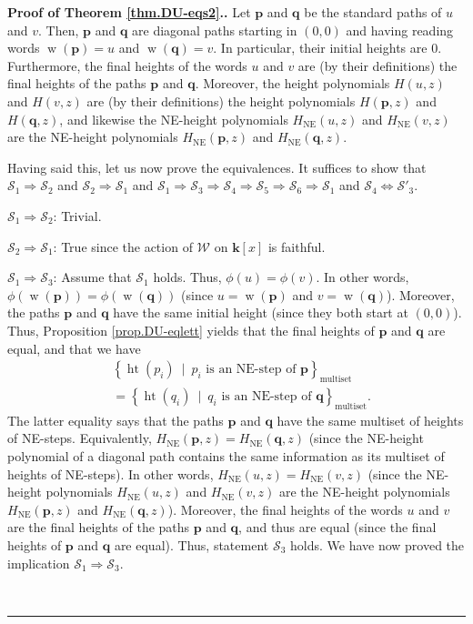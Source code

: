 \documentclass[numbers=enddot,12pt,final,onecolumn,notitlepage]{scrartcl}%
\theoremstyle{definition}
\newenvironment{proof}[1][Proof]{\noindent\textbf{#1.} }{\ \rule{0.5em}{0.5em}}
\newcommand{\W}{\mathcal{W}}
\newcommand{\kk}{\mathbf{k}}
\newcommand{\pp}{\mathbf{p}}
\newcommand{\qq}{\mathbf{q}}
\newcommand{\NE}{\operatorname{NE}}
\newcommand{\w}{\operatorname{w}}
\newcommand{\htt}{\operatorname{ht}}
\newcommand{\multiset}{\operatorname{multiset}}
\newcommand{\tup}[1]{\left( #1 \right)}
\begin{document}
\begin{proof}[Proof of Theorem \ref{thm.DU-eqs2}.]
Let $\pp$ and $\qq$ be the standard paths of $u$ and $v$.
Then, $\pp$ and $\qq$ are diagonal paths starting in $\tup{0,0}$ and having reading words $\w\tup{\pp} = u$ and $\w\tup{\qq} = v$.
In particular, their initial heights are $0$.
Furthermore,
the final heights of the words $u$ and $v$ are (by their definitions)
the final heights of the paths $\pp$ and $\qq$.
Moreover, the height polynomials $H\tup{u,z}$ and $H\tup{v,z}$ are (by
their definitions) the height polynomials $H\left(  \pp,z\right)  $ and
$H\left(  \qq,z\right)  $, and likewise the NE-height polynomials
$H_{\NE}\left(  u,z\right)  $ and $H_{\NE}\left(  v,z\right)  $ are
the NE-height polynomials $H_{\NE}\left(  \pp,z\right)  $ and $H_{\NE}\left(  \qq,z\right)  $.

Having said this, let us now prove the equivalences. It suffices to show that $\mathcal{S}_1 \Longrightarrow \mathcal{S}_2$ and $\mathcal{S}_2 \Longrightarrow \mathcal{S}_1$ and $\mathcal{S}_1 \Longrightarrow \mathcal{S}_3 \Longrightarrow \mathcal{S}_4 \Longrightarrow \mathcal{S}_5 \Longrightarrow \mathcal{S}_6 \Longrightarrow \mathcal{S}_1$ and $\mathcal{S}_4 \Longleftrightarrow \mathcal{S}'_3$.
\medskip

$\mathcal{S}_{1}\Longrightarrow\mathcal{S}_{2}$: Trivial.
\medskip

$\mathcal{S}_{2}\Longrightarrow\mathcal{S}_{1}$: True since the action of
$\W$ on $\kk\left[  x\right]  $ is faithful.
\medskip

$\mathcal{S}_{1}\Longrightarrow\mathcal{S}_{3}$: Assume that $\mathcal{S}_1$ holds. Thus, $\phi\left(u\right) = \phi\left(v\right)$. In other words, $\phi\tup{\w\tup{\pp}} = \phi\tup{\w\tup{\qq}}$ (since $u = \w\tup{\pp}$ and $v = \w\tup{\qq}$).
Moreover, the paths $\pp$ and $\qq$ have the same initial height (since they both start at $\tup{0,0}$).
Thus, Proposition \ref{prop.DU-eqlett} yields that the final heights of $\pp$ and $\qq$ are equal, and that we have
\begin{align*}
&  \left\{  \htt\left(  p_{i}\right)  \ \mid\ p_{i}\text{ is an
NE-step of }\pp\right\}  _{\multiset}\\
&  =\left\{  \htt\left(  q_{i}\right)  \ \mid\ q_{i}\text{ is an
NE-step of }\qq\right\}  _{\multiset}.
\end{align*}
The latter equality says that the paths $\pp$ and $\qq$ have the same multiset of heights of NE-steps.
Equivalently, $H_{\NE}\tup{\pp, z} = H_{\NE}\tup{\qq, z}$ (since the NE-height polynomial of a diagonal path contains the same information as its multiset of heights of NE-steps).
In other words, $H_{\NE}\tup{u, z} = H_{\NE}\tup{v, z}$
(since the NE-height polynomials
$H_{\NE}\left(  u,z\right)  $ and $H_{\NE}\left(  v,z\right)  $ are
the NE-height polynomials $H_{\NE}\left(  \pp,z\right)  $ and $H_{\NE}\left(  \qq,z\right)  $).
Moreover, the final heights of the words $u$ and $v$ are
the final heights of the paths $\pp$ and $\qq$, and thus are equal (since the final heights of $\pp$ and $\qq$ are equal).
Thus, statement $\mathcal{S}_3$ holds.
We have now proved the implication $\mathcal{S}_1 \Longrightarrow \mathcal{S}_3$.
\medskip


\end{proof}
\end{document}
